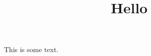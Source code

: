 \documentclass{article}
\title{Hello}
\begin{document}
\maketitle
	
This is some text.
\end{document}
